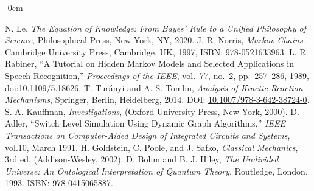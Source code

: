 \documentclass[entropy,article,submit,pdftex,oneauthor]{Definitions/mdpi}
\begin{document}
\begin{adjustwidth}{-\extralength}{0cm}
\begin{thebibliography}{999}
     N. Le, \textit{The Equation of Knowledge: From Bayes’ Rule to a Unified Philosophy of Science}, Philosophical Press, New York, NY, 2020.
    J. R. Norris, \emph{Markov Chains}. Cambridge University Press, Cambridge, UK, 1997, ISBN: 978-0521633963.
    L. R. Rabiner, ``A Tutorial on Hidden Markov Models and Selected Applications in Speech Recognition,'' 
    \emph{Proceedings of the IEEE}, vol.~77, no.~2, pp.~257--286, 1989, doi:10.1109/5.18626.
    T. Turányi and A. S. Tomlin, \emph{Analysis of Kinetic Reaction Mechanisms}, Springer, Berlin, Heidelberg, 2014. DOI: \href{https://doi.org/10.1007/978-3-642-38724-0}{10.1007/978-3-642-38724-0}.
    S. A. Kauffman, \emph{Investigations}, (Oxford University Press, New York, 2000).
    D. Adler, ``Switch Level Simulation Using Dynamic Graph Algorithms,'' \emph{IEEE Transactions on Computer-Aided Design of Integrated Circuits and Systems}, vol.10, March 1991.
     H. Goldstein, C. Poole, and J. Safko, \textit{Classical Mechanics}, 3rd ed. (Addison-Wesley, 2002).
    D. Bohm and B. J. Hiley, \emph{The Undivided Universe: An Ontological Interpretation of Quantum Theory}, Routledge, London, 1993. ISBN: 978-0415065887.

\end{thebibliography}

%


\PublishersNote{}
\end{adjustwidth}
\end{document}

